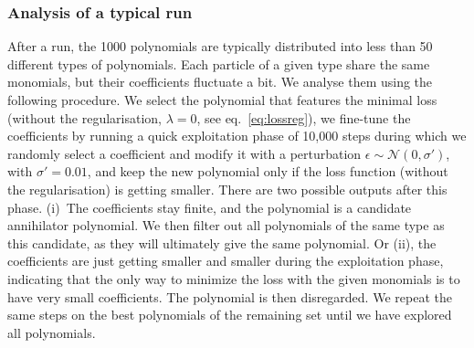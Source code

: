 \documentclass[11pt,a4paper]{article}
\begin{document}
	\subsubsection{Analysis of a typical run}\label{sec:1runanalysis}
	After a run, the 1000 polynomials are typically distributed into less than 50 different types of polynomials. Each particle of a given type share the same monomials, but their coefficients fluctuate a bit. We analyse them using the following procedure. We select the polynomial that features the minimal loss (without the regularisation, $\lambda=0$, see eq.~\eqref{eq:lossreg}), we fine-tune the coefficients by running a quick exploitation phase of 10,000 steps during which we randomly select a coefficient and modify it with a perturbation $\epsilon \sim \mathcal{N}(0, \sigma')$, with $\sigma'=0.01$, and keep the new polynomial only if the loss function (without the regularisation) is getting smaller. There are two possible outputs after this phase. (i)~The coefficients stay finite, and the polynomial is a candidate annihilator polynomial. We then filter out all  polynomials of the same type as this candidate, as they will ultimately give the same polynomial. Or (ii), the coefficients are just getting smaller and smaller during the exploitation phase, indicating that the only way to minimize the loss with the given monomials is to have very small coefficients. The polynomial is then disregarded. We repeat the same steps on the best polynomials of the remaining set until we have explored all polynomials.
\end{document}
